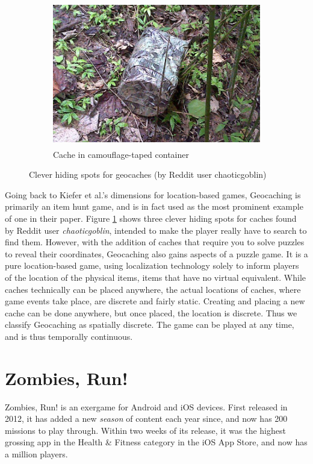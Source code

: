 \begin{figure}[h]
\begin{subfigure}[t]{\textwidth}
		\centering
		\includegraphics[height=2.5in]{Figures/chaoticgoblin-geocache-camo}
		\caption{Cache in camouflage-taped container}
	\end{subfigure}
	\caption{Clever hiding spots for geocaches (by Reddit user chaoticgoblin)}
	\label{fig:geocache-spots}
\end{figure}

Going back to Kiefer et al.'s \cite{kiefer2006systematically} dimensions for location-based games, Geocaching is primarily an item hunt game, and is in fact used as the most prominent example of one in their paper. Figure \ref{fig:geocache-spots} shows three clever hiding spots for caches found by Reddit user \emph{chaoticgoblin}, intended to make the player really have to search to find them. However, with the addition of caches that require you to solve puzzles to reveal their coordinates, Geocaching also gains aspects of a puzzle game. It is a pure location-based game, using localization technology solely to inform players of the location of the physical items, items that have no virtual equivalent. While caches technically can be placed anywhere, the actual locations of caches, where game events take place, are discrete and fairly static. Creating and placing a new cache can be done anywhere, but once placed, the location is discrete. Thus we classify Geocaching as spatially discrete. The game can be played at any time, and is thus temporally continuous.

\section{Zombies, Run!}

Zombies, Run! is an exergame for Android and iOS devices. First released in 2012, it has added a new \emph{season} of content each year since, and now has 200 missions to play through. Within two weeks of its release, it was the highest grossing app in the Health \& Fitness category in the iOS App Store, and now has a million players.

